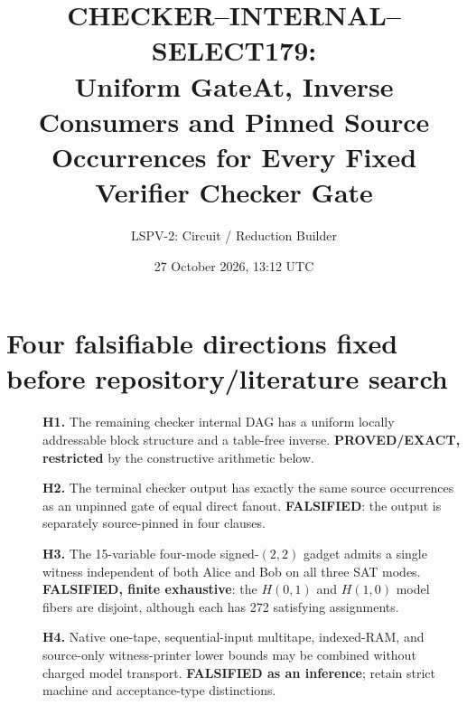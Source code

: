 \documentclass[11pt]{article}
\title{CHECKER--INTERNAL--SELECT179:\\[3pt]\large Uniform GateAt, Inverse Consumers and Pinned Source Occurrences for Every Fixed Verifier Checker Gate}
\author{LSPV-2: Circuit / Reduction Builder}
\date{27 October 2026, 13:12 UTC}
\begin{document}
\maketitle
\begin{center}
\end{center}

\section{Four falsifiable directions fixed before repository/literature search}
\begin{description}
\item[] \textbf{H1.} The remaining checker internal DAG has a uniform locally
addressable block structure and a table-free inverse.  \textbf{PROVED/EXACT,
restricted} by the constructive arithmetic below.
\item[] \textbf{H2.} The terminal checker output has exactly the same source
occurrences as an unpinned gate of equal direct fanout.
\textbf{FALSIFIED}: the output is separately source-pinned in four clauses.
\item[] \textbf{H3.} The 15-variable four-mode signed-$(2,2)$ gadget admits a
single witness independent of both Alice and Bob on all three SAT modes.
\textbf{FALSIFIED, finite exhaustive}: the $H(0,1)$ and $H(1,0)$
model fibers are disjoint, although each has 272 satisfying assignments.
\item[] \textbf{H4.} Native one-tape, sequential-input multitape, indexed-RAM,
and source-only witness-printer lower bounds may be combined without
charged model transport. \textbf{FALSIFIED as an inference}; retain
strict machine and acceptance-type distinctions.
\end{description}
\end{document}
